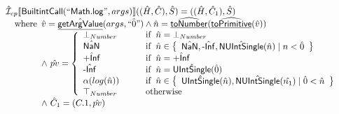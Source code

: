 \documentclass{article}
\newcommand{\SF}[1]{\mbox{\textsf{#1}}}
\newcommand{\wherec}[1]{{\rm where}\begin{array}[t]{l}#1\end{array}}
\newcommand{\ifc}[1]{{\rm if}\begin{array}[t]{l}#1\end{array}}
\newcommand{\owc}{{\rm otherwise}}
\newcommand{\aI}{\hat{\mathcal{I}}}
\newcommand{\set}[1]{\left\{\begin{array}{l}#1\end{array}\right\}}
\newcommand{\lbr}{\llbracket}
\newcommand{\rbr}{\rrbracket}
\newcommand{\hf}[1]{\underline{\sf #1}}
\newcommand{\ahf}[1]{\widehat{\underline{\sf #1}}}
\begin{document}
\[\begin{array}{l}
\aI _{cp}\lbr \SF{BuiltintCall}(``\SF{Math.log}",args)\rbr((\hat{H},\hat{C}), \hat{S})
  = ((\hat{H}, \hat{C}_1), \hat{S})\\
\quad\wherec{
  \hat{v}=\hat{\hf{getArgValue}}(args, \hat{``0"}) \land \hat{n}=\ahf{toNumber}(\ahf{toPrimitive}(\hat{v}))\\
  \land\ \hat{pv}   = 
  \left\{
    \begin{array}{l@{\quad\quad\quad}l}
      \bot_{Number} & \ifc{\hat{n} = \bot_{Number}}\\
      \hat{\SF{NaN}} & \ifc{\hat{n} \in \set{\hat{\SF{NaN}}, \hat{\SF{-Inf}}, \hat{\SF{NUIntSingle}}(\hat{n}) \mid n<\hat{0}}}\\
      \hat{\SF{+Inf}} & \ifc{\hat{n} = \hat{\SF{+Inf}}}\\
      \hat{\SF{-Inf}} & \ifc{\hat{n} =\hat{\SF{UIntSingle}}(\hat{0})}\\
      \alpha(log(\hat{n})) & \ifc{\hat{n} \in \set{\hat{\SF{UIntSingle}}(\hat{n}), \hat{\SF{NUIntSingle}}(\hat{n_1}) \mid \hat{0}<\hat{n}}}\\
      \top_{Number} & \owc\\
    \end{array}
  \right.\\
  \land\ \hat{C}_1 = (C.1, \hat{pv})
  }\\
\\\\


\end{array}
\]
\end{document}
